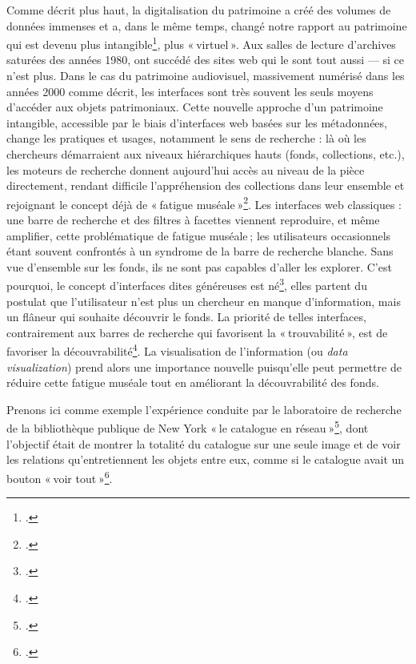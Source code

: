 Comme décrit plus haut, la digitalisation du patrimoine a créé des volumes de données immenses et a, dans le même temps, changé notre rapport au patrimoine qui est devenu plus intangible\footcite[p. 1]{windhager_visualization_2019}, plus « virtuel ». Aux salles de lecture d’archives saturées des années 1980, ont succédé des sites web qui le sont tout aussi — si ce n’est plus. Dans le cas du patrimoine audiovisuel, massivement numérisé dans les années 2000 comme décrit, les interfaces sont très souvent les seuls moyens d’accéder aux objets patrimoniaux. Cette nouvelle approche d’un patrimoine intangible, accessible par le biais d’interfaces web basées sur les métadonnées, change les pratiques et usages, notamment le sens de recherche : là où les chercheurs démarraient aux niveaux hiérarchiques hauts (fonds, collections, etc.), les moteurs de recherche donnent aujourd’hui accès au niveau de la pièce directement, rendant difficile l’appréhension des collections dans leur ensemble et rejoignant le concept déjà de « fatigue muséale »\footcite[pp. 62-72]{gilman_museum_1916}. Les interfaces web classiques : une barre de recherche et des filtres à facettes viennent reproduire, et même amplifier, cette problématique de fatigue muséale ; les utilisateurs occasionnels étant souvent confrontés à un syndrome de la barre de recherche blanche. Sans vue d’ensemble sur les fonds, ils ne sont pas capables d’aller les explorer. C’est pourquoi, le concept d’interfaces dites généreuses est né\footcite[pp. 5-6]{windhager_orchestrating_2018}, elles partent du postulat que l’utilisateur n’est plus un chercheur en manque d’information, mais un flâneur qui souhaite découvrir le fonds. La priorité de telles interfaces, contrairement aux barres de recherche qui favorisent la « trouvabilité », est de favoriser la découvrabilité\footcite[p. 18]{shen_generous_2023}. La visualisation de l’information (ou \textit{data visualization}) prend alors une importance nouvelle puisqu’elle peut permettre de réduire cette fatigue muséale tout en améliorant la découvrabilité des fonds.

Prenons ici comme exemple l’expérience conduite par le laboratoire de recherche de la bibliothèque publique de New York « le catalogue en réseau »\footcite[§20 à §26]{lapotre_visualiser_2016}, dont l’objectif était de montrer la totalité du catalogue sur une seule image et de voir les relations qu’entretiennent les objets entre eux, comme si le catalogue avait un bouton « voir tout »\footcite{miller_networked_2014}.


